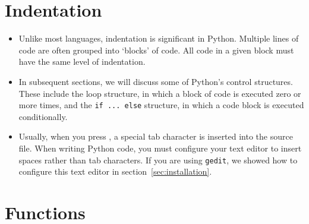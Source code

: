 \documentclass[a4paper,twoside,titlepage]{memoir}
\newcommand{\shellcmd}{\texttt}
\begin{document}
\section{Indentation}
\begin{itemize}
\item Unlike most languages, indentation is significant in Python.  Multiple lines of code are often grouped into `blocks' of code.  All code in a given block must have the same level of indentation.
\item In subsequent sections, we will discuss some of Python's control structures.  These include the loop structure, in which a block of code is executed zero or more times, and the \shellcmd{if ... else} structure, in which a code block is executed conditionally.
\item Usually, when you press \keys{\tab}, a special tab character is inserted into the source file.  When writing Python code, you must configure your text editor to insert spaces rather than tab characters.  If you are using \shellcmd{gedit}, we showed how to configure this text editor in section~\ref{sec:installation}.
\end{itemize}

\section{Functions}
\label{sec:functions}
\end{document}
